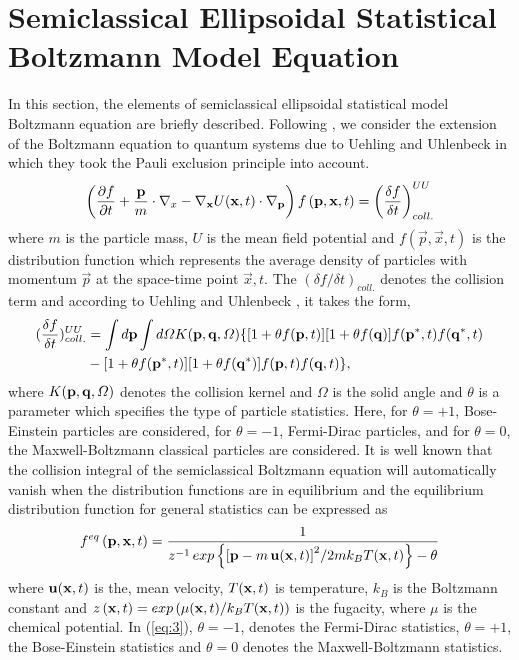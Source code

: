 \documentclass{rsproca}%
\begin{document}
\section{Semiclassical Ellipsoidal Statistical Boltzmann Model Equation}
\label{sec:2}
In this section, the elements of semiclassical ellipsoidal statistical model Boltzmann equation are briefly described.   Following \cite{PhysRev.43.552,KadanoffBaym}, we consider the extension of the Boltzmann equation to quantum systems due to Uehling and Uhlenbeck  in which they took the Pauli exclusion principle into account.
\begin{equation}
\left(\frac{\partial f}{\partial t}+\frac{\bf p}{m}\cdot {\bf\nabla }_x-{\bf \nabla}_{\bf x} U({\bf x},t)\cdot {\bf\nabla }_{\bf p}\right)f\left({\bf p},{\bf x},t\right)=\left(\frac{\delta f}{\delta t}\right)^{UU}_{coll.}
\end{equation}
where $m$ is the particle mass, $U$ is the mean field potential and $f(\vec p, \vec x, t)$ is the distribution function
which represents the average density of particles with momentum $\vec p$ at the space-time point $\vec x, t$. The $(\delta f
/\delta t)_{coll.}$ denotes the collision term and according to Uehling and Uhlenbeck \cite{PhysRev.43.552}, it takes the form,
\begin{align}
(\frac{\delta f} {\delta t})^{UU}_{coll.} &= \int d {\bf p} \int d\Omega
K({\bf p}, {\bf q}, \Omega) \{ [ 1+ \theta f({\bf p}, t)][1+ \theta f({\bf q})]f({\bf p}^*, t)f({\bf q}^*, t) \nonumber \\
&- [ 1+ \theta f({\bf p}^*, t)][1+ \theta f({\bf q}^*)]f({\bf p}, t)f({\bf q}, t) \},
\end{align}
where $K({\bf p}, {\bf q}, \Omega)$ denotes the collision kernel and $\Omega$ is the solid angle and $\theta$ is a parameter which specifies the type of particle statistics.   Here, for $\theta=+1$, Bose-Einstein particles are considered, for $\theta=-1$, Fermi-Dirac particles, and for $\theta=0$, the Maxwell-Boltzmann classical particles are considered.  It is well known that the collision integral of the semiclassical Boltzmann equation will automatically vanish when the distribution functions are in equilibrium and the equilibrium distribution function for general statistics can be expressed as
\begin{equation}
f^{eq}\left({\bf p},{\bf x},t\right) =\frac{1}{z^{-1}\,exp\left\{{\left[{\bf p}-m\,{\bf u}({\bf x},t) \right]}^2/2mk_BT({\bf x},t)\right\} -\theta }
\end{equation}
where $ {\bf u}({\bf x},t)$ is the, mean velocity, $T({\bf x},t)$ is temperature, $k_B$ is the Boltzmann constant and $z\left({\bf x},t\right)= exp\left({\mu ({\bf x},t)/k_BT({\bf x},t)}\right)$ is the fugacity, where $\mu$ is the chemical potential.  In (\ref{eq:3}), \(\theta=-1\), denotes the Fermi-Dirac statistics, \(\theta=+1\), the Bose-Einstein statistics and \(\theta=0\) denotes the Maxwell-Boltzmann statistics.
\end{document}

